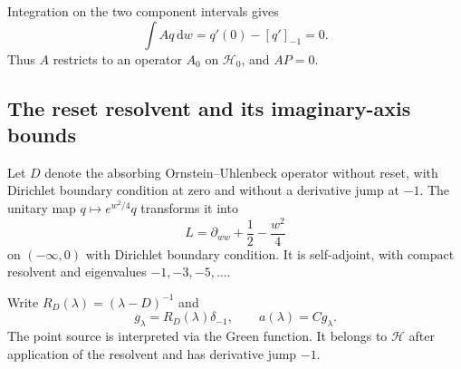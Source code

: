 \documentclass[11pt,a4paper]{article}
\numberwithin{equation}{section}
\theoremstyle{remark}\newtheorem{remark}[theorem]{Remark}
\newcommand{\HH}{\mathcal H}\newcommand{\DD}{\mathcal D}
\newcommand{\dd}{\,\mathrm d}
\begin{document}
Integration on the two component intervals gives
\begin{equation}\label{eq:massA}
 \int Aq\dd w=q'(0)-[q']_{-1}=0.
\end{equation}
Thus $A$ restricts to an operator $A_0$ on $\HH_0$, and $AP=0$.

\subsection{The reset resolvent and its imaginary-axis bounds}
Let $D$ denote the absorbing Ornstein--Uhlenbeck operator without reset, with Dirichlet boundary condition at zero and without a derivative jump at $-1$. The unitary map $q\mapsto e^{w^2/4}q$ transforms it into
\[
 L=\partial_{ww}+\frac12-\frac{w^2}{4}
\]
on $(-\infty,0)$ with Dirichlet boundary condition. It is self-adjoint, with compact resolvent and eigenvalues $-1,-3,-5,\ldots$.

Write $R_D(\lambda)=(\lambda-D)^{-1}$ and
\[
 g_\lambda=R_D(\lambda)\delta_{-1},\qquad
 a(\lambda)=Cg_\lambda.
\]
The point source is interpreted via the Green function. It belongs to $\HH$ after application of the resolvent and has derivative jump $-1$.
\end{document}

